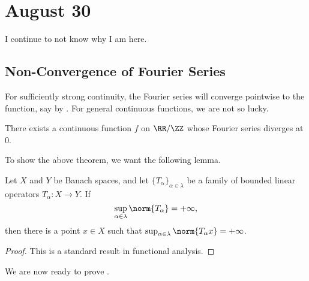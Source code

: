 \documentclass[../notes.tex]{subfiles}
\begin{document}
\section{August 30}

I continue to not know why I am here.

\subsection{Non-Convergence of Fourier Series}
For sufficiently strong continuity, the Fourier series will converge pointwise to the function, say by . For general continuous functions, we are not so lucky.
\begin{theorem} \label{thm:non-conv-for-cont}
	There exists a continuous function $f$ on $\RR/\ZZ$ whose Fourier series diverges at $0$.
\end{theorem}
To show the above theorem, we want the following lemma.
\begin{lemma} \label{lem:uni-boundedness}
	Let $X$ and $Y$ be Banach spaces, and let $\{T_\alpha\}_{\alpha\in\lambda}$ be a family of bounded linear operators $T_\alpha\colon X\to Y$. If
	\[\sup_{\alpha\in\lambda}\norm{T_\alpha}=+\infty,\]
	then there is a point $x\in X$ such that $\sup_{\alpha\in\lambda}\norm{T_\alpha x}=+\infty$.
\end{lemma}
\begin{proof}
	This is a standard result in functional analysis.
\end{proof}
We are now ready to prove .
\end{document}
